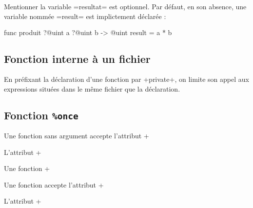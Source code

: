Mentionner la variable \ggs=resultat= est optionnel. Par défaut, en son absence, une variable nommée \ggs=result= est implictement déclarée :

\begin{galgas}
func produit ?@uint a ?@uint b -> @uint {
  result = a * b
}
\end{galgas}




\subsection{Fonction interne à un fichier}

En préfixant la déclaration d'une fonction par \ggs+private+, on limite son appel aux expressions situées dans le même fichier que la déclaration.




\subsection{Fonction \texttt{\%once}}

Une fonction sans argument accepte l'attribut \ggs+%


L'attribut \ggs+%

Une fonction \ggs+%








Une fonction accepte l'attribut \ggs+%


L'attribut \ggs+%

